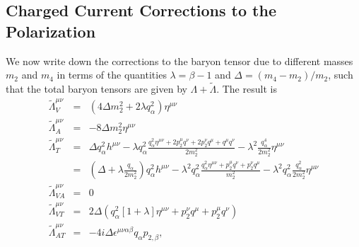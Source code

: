 \documentclass[12pt,letter]{article}
\begin{document}
\subsection{Charged Current Corrections to the Polarization}
We now write down the corrections to the baryon tensor due to different masses
$m_2$ and $m_4$ in terms of the quantities $\lambda=\beta - 1$ and $\Delta = (m_4-m_2)/m_2$, such that the total baryon tensors are given by $\Lambda + 
\tilde \Lambda$. The result is
\begin{eqnarray}
\tilde \Lambda^{\mu\nu}_V &=& (4 \Delta m_2^2 + 2 \lambda q_\alpha^2) 
\eta^{\mu \nu}\\
\tilde \Lambda^{\mu\nu}_A &=& -8 \Delta m_2^2 \eta^{\mu \nu} \\
\tilde \Lambda^{\mu\nu}_T &=& \Delta q_\alpha^2 h^{\mu \nu} 
 - \lambda q_\alpha^2 \frac{q_\alpha^2 \eta^{\mu \nu} + 2 p_2^\mu q^\nu 
 + 2p_2^\nu q^\mu + q^\mu q^\nu}{2 m_2^2}
 - \lambda^2 \frac{q_\alpha^4 }{2 m_2^2} \eta^{\mu \nu}
\\
&=& \left(\Delta + \lambda \frac{q_\alpha}{2 m_2^2} \right) q_\alpha^2 h^{\mu \nu}
- \lambda^2 q_\alpha^2 
\frac{q_\alpha^2 \eta^{\mu \nu} + p_2^\mu q^\nu + p_2^\nu q^\mu}{m_2^2} 
- \lambda^2  q_\alpha^2 \frac{q_\alpha^2}{2m_2^2} \eta^{\mu \nu}
\\
\tilde \Lambda^{\mu\nu}_{VA} &=& 0
\\
\tilde \Lambda^{\mu\nu}_{VT} &=& 2 \Delta (q_\alpha^2[1+\lambda] \eta^{\mu \nu} 
+ p_2^\nu q^\mu + p_2^\mu q^\nu)
\\
\tilde \Lambda^{\mu\nu}_{AT} &=& -4 i \Delta 
\epsilon^{\mu \nu \alpha \beta}q_\alpha p_{2,\beta} , 
\end{eqnarray}
\end{document}
